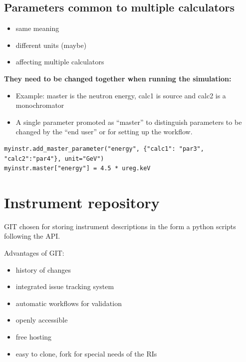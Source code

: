 \documentclass[11pt, a4paper]{article}
\begin{document}
\subsection{Parameters common to multiple calculators}

  \begin{itemize}
  \item same meaning
  \item different units (maybe)
  \item affecting multiple calculators
  \end{itemize}

 \textbf{ They need to be changed together when running the simulation:
 }


    \begin{itemize}
    \item Example: master is the neutron energy, calc1 is source and calc2 is a monochromator
      
    \item A single parameter promoted as ``master'' to distinguish parameters to be changed by the ``end user'' or for setting up the workflow.
    \end{itemize}
  
  \begin{lstlisting}
myinstr.add_master_parameter("energy", {"calc1": "par3", "calc2":"par4"}, unit="GeV")
myinstr.master["energy"] = 4.5 * ureg.keV
\end{lstlisting}

\section{Instrument repository}

  GIT chosen for storing instrument descriptions in the form a python scripts following
  the \libpyvinyl API.

  Advantages of GIT:
  \begin{itemize}
  \item history of changes
  \item integrated issue tracking system
  \item automatic workflows for validation
  \item openly accessible
  \item free hosting
  \item easy to clone, fork for special needs of the RIs
  \end{itemize}
\end{document}
